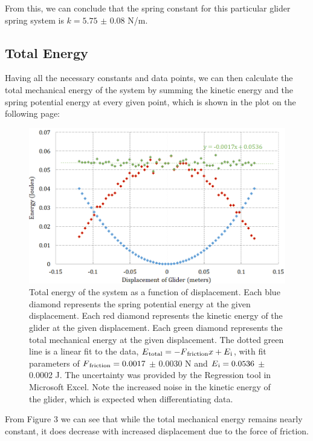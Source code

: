 \documentclass[titlepage]{article}
\begin{document}
From this, we can conclude that the spring constant for this particular glider spring system is $k = 5.75$ $\pm$ 0.08 N/m.

\subsection{Total Energy}

Having all the necessary constants and data points, we can then calculate the total mechanical energy of the system by summing the kinetic energy and the spring potential energy at every given point, which is shown in the plot on the following page:

\pagebreak

\begin{figure}[!htbp]
    \centering
    \includegraphics[width=4.75in]{MechEnergy.png}
    \caption{Total energy of the system as a function of displacement. Each blue diamond represents the spring potential energy at the given displacement. Each red diamond represents the kinetic energy of the glider at the given displacement.  Each green diamond represents the total mechanical energy at the given displacement. The dotted green line is a linear fit to the data, $E\textsubscript{total} = -F\textsubscript{friction}x+E\textsubscript{i}$, with fit parameters of $F\textsubscript{friction} = 0.0017$ $\pm$ 0.0030 N and $E\textsubscript{i} = 0.0536$ $\pm$ 0.0002 J. The uncertainty was provided by the Regression tool in Microsoft Excel. Note the increased noise in the kinetic energy of the glider, which is expected when differentiating data.}
\end{figure}

From Figure 3 we can see that while the total mechanical energy remains nearly constant, it does decrease with increased displacement due to the force of friction.
\end{document}
